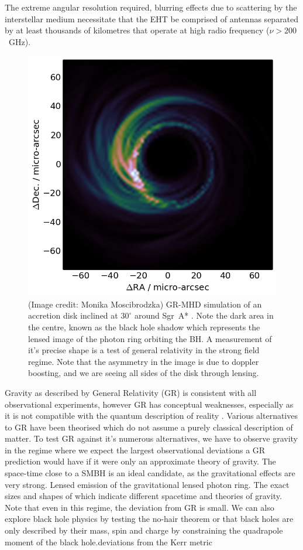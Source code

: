 The extreme angular resolution required, blurring effects due to scattering by the interstellar medium \citep[ISM; e.g.][]{Fish_2014} necessitate that the EHT be comprised of antennas separated by at least thousands of kilometres that operate at high radio frequency ($\nu>200$~GHz).  

\begin{figure}
\begin{center}
\includegraphics[width=0.5\columnwidth]{Images/disk30}
\caption{(Image credit: Monika Moscibrodzka) GR-MHD simulation of an accretion disk inclined at $30^\circ$ around Sgr~A* \citep{Moscibrodzka_2014}. Note the dark area in the centre, known as the black hole shadow which represents the lensed image of the photon ring orbiting the BH. A measurement of it's precise shape is a test of general relativity in the strong field regime. Note that the asymmetry in the image is due to doppler boosting, and we are seeing all sides of the disk through lensing. \label{fig:grmhd}%
}
\end{center}

\end{figure}


Gravity as described by General Relativity (GR) is consistent with all observational experiments, however GR has conceptual weaknesses, especially as it is not compatible with the quantum description of reality \citep{Goddi_2016}. Various alternatives to GR have been theorised which do not assume a purely classical description of matter. To test GR against it's numerous alternatives, we have to observe gravity in the regime where we expect the largest observational deviations a GR prediction would have if it were only an approximate theory of gravity. The space-time close to a SMBH is an ideal candidate, as the gravitational effects are very strong. Lensed emission of the gravitational lensed photon ring.  The exact sizes and shapes of which indicate different spacetime and theories of gravity. Note that even in this regime, the deviation from GR is small. We can also explore black hole physics by testing the no-hair theorem or that black holes are only described by their mass, spin and charge by constraining the quadrapole moment of the black hole.deviations
from the Kerr metric

